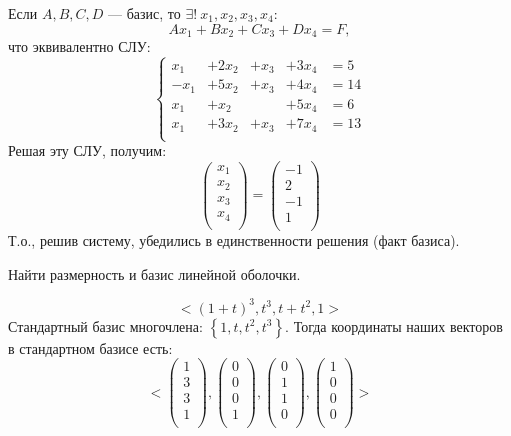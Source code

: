 Если $A, B, C, D$ --- базис, то $\exists !\ x_1, x_2, x_3, x_4$:
$$
Ax_1+Bx_2+Cx_3+Dx_4=F,
$$
что эквивалентно СЛУ:
$$
\left\{
\begin{array}{rrrrl}
x_1&+2x_2&+x_3&+3x_4&=5\\
-x_1&+5x_2&+x_3&+4x_4&=14\\
x_1&+x_2&&+5x_4&=6\\
x_1&+3x_2&+x_3&+7x_4&=13\\
\end{array}
\right.
$$
Решая эту СЛУ, получим:
$$
\begin{pmatrix}
x_1\\
x_2\\
x_3\\
x_4\\
\end{pmatrix}
=
\begin{pmatrix}
-1\\
2\\
-1\\
1\\
\end{pmatrix}
$$
Т.о., решив систему, убедились в единственности решения (факт базиса).
\begin{prim}
Найти размерность и базис линейной оболочки.
\end{prim}
$$
<(1+t)^3, t^3, t+t^2, 1>
$$
Стандартный базис многочлена: $\left\{1, t, t^2, t^3 \right\}$.
Тогда координаты наших векторов в стандартном базисе есть:
$$
<
\begin{pmatrix}
1\\
3\\
3\\
1\\
\end{pmatrix}
,
\begin{pmatrix}
0\\
0\\
0\\
1\\
\end{pmatrix}
,
\begin{pmatrix}
0\\
1\\
1\\
0\\
\end{pmatrix}
,
\begin{pmatrix}
1\\
0\\
0\\
0\\
\end{pmatrix}
>
$$
